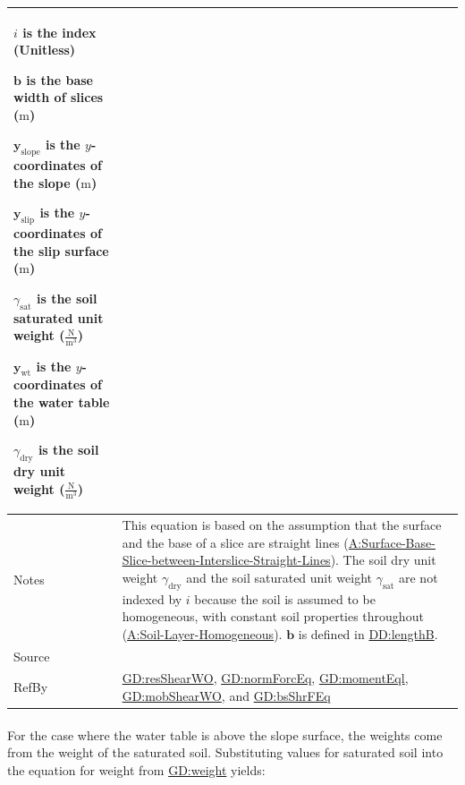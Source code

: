 \documentclass[12pt]{article}
\begin{document}
\begin{minipage}{\textwidth}
\begin{tabular}{>{\raggedright}p{}>{\raggedright\arraybackslash}p{}}
\begin{symbDescription}
              \item{$i$ is the index (Unitless)}
              \item{$\symbf{b}$ is the base width of slices (${\text{m}}$)}
              \item{${\symbf{y}_{\text{slope}}}$ is the $y$-coordinates of the slope (${\text{m}}$)}
              \item{${\symbf{y}_{\text{slip}}}$ is the $y$-coordinates of the slip surface (${\text{m}}$)}
              \item{${γ_{\text{sat}}}$ is the soil saturated unit weight ($\frac{\text{N}}{\text{m}^{3}}$)}
              \item{${\symbf{y}_{\text{wt}}}$ is the $y$-coordinates of the water table (${\text{m}}$)}
              \item{${γ_{\text{dry}}}$ is the soil dry unit weight ($\frac{\text{N}}{\text{m}^{3}}$)}
              \end{symbDescription}
\\ \midrule
Notes & This equation is based on the assumption that the surface and the base of a slice are straight lines (\hyperref[assumpSBSBISL]{A:Surface-Base-Slice-between-Interslice-Straight-Lines}). The soil dry unit weight ${γ_{\text{dry}}}$ and the soil saturated unit weight ${γ_{\text{sat}}}$ are not indexed by $i$ because the soil is assumed to be homogeneous, with constant soil properties throughout (\hyperref[assumpSLH]{A:Soil-Layer-Homogeneous}). $\symbf{b}$ is defined in \hyperref[DD:lengthB]{DD:lengthB}.
        
\\ \midrule
Source & \cite{fredlund1977}
         
\\ \midrule
RefBy & \hyperref[GD:resShearWO]{GD:resShearWO}, \hyperref[GD:normForcEq]{GD:normForcEq}, \hyperref[GD:momentEql]{GD:momentEql}, \hyperref[GD:mobShearWO]{GD:mobShearWO}, and \hyperref[GD:bsShrFEq]{GD:bsShrFEq}
        
\\ \bottomrule
\end{tabular}
\end{minipage}

\paragraph{}
\label{GD:sliceWghtDeriv}
For the case where the water table is above the slope surface, the weights come from the weight of the saturated soil. Substituting values for saturated soil into the equation for weight from \hyperref[GD:weight]{GD:weight} yields:
\end{document}
